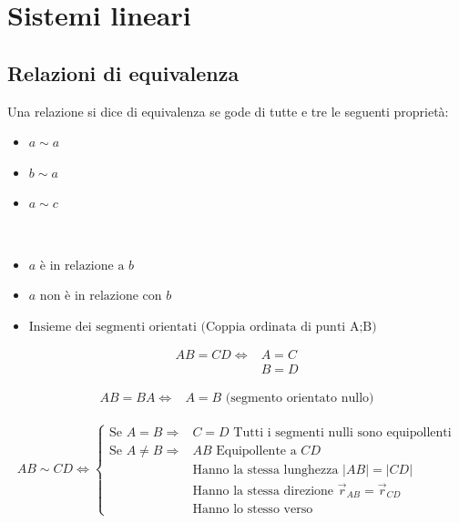 \chapter{Sistemi lineari}
\section{Relazioni di equivalenza}

Una relazione si dice di equivalenza se gode di tutte e tre le
seguenti proprietà:

\begin{itemize}
  \item{
     $a\sim a$}
  \item{
     $b\sim a$}
  \item{
       $a\sim c$}
\end{itemize}

\begin{nota}
  \phantom{text}
  \leavevmode\\
  \begin{itemize}
    \item[]{     $a \text{ è in relazione a }b$}
    \item[]{   $a \text{ non è in
      relazione con }b$}
    \item[]{\makebox[2cm]{$\sum$\hfill}     $\text{Insieme dei
      segmenti orientati (Coppia ordinata di punti A;B)}$}
  \end{itemize}
\end{nota}

\begin{align*}
  AB=CD\Leftrightarrow
  &A=C \\
  &B=D
\end{align*}

\begin{align*}
  AB=BA\Leftrightarrow
  &A=B \text{ (segmento orientato nullo)}
\end{align*}

\begin{align*}
  AB\sim CD\Leftrightarrow
  \begin{cases}
    \text{Se } A=B\Rightarrow 		& C=D \text{ Tutti i segmenti nulli
    sono equipollenti}\\
    \text{Se } A\neq B\Rightarrow 	& AB \text{ Equipollente a } CD\\
    								& \text{Hanno la stessa lunghezza } |AB|=|CD|\\
    								& \text {Hanno la stessa direzione } \overrightarrow{r}_{AB}=\overrightarrow{r}_{CD}\\
    								&\text{Hanno lo stesso verso}
  \end{cases}
\end{align*}

